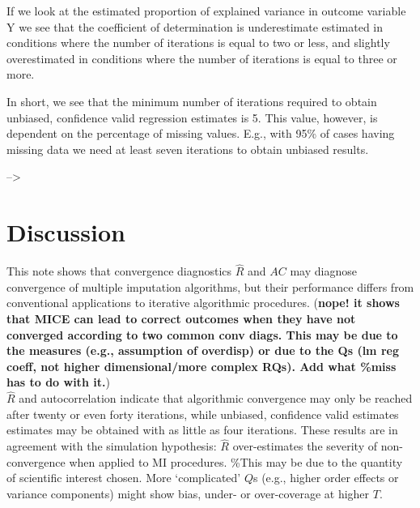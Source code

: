 \documentclass[Royal,times,sageh]{sagej}
\begin{document}
If we look at the estimated proportion of explained variance in outcome
variable Y we see that the coefficient of determination is underestimate
estimated in conditions where the number of iterations is equal to two
or less, and slightly overestimated in conditions where the number of
iterations is equal to three or more.

In short, we see that the minimum number of iterations required to
obtain unbiased, confidence valid regression estimates is 5. This value,
however, is dependent on the percentage of missing values. E.g., with
95\% of cases having missing data we need at least seven iterations to
obtain unbiased results.

--\textgreater{}

\hypertarget{discussion}{%
\section{Discussion}\label{discussion}}

This note shows that convergence diagnostics \(\widehat{R}\) and \(AC\)
may diagnose convergence of multiple imputation algorithms, but their
performance differs from conventional applications to iterative
algorithmic procedures. (\textbf{nope! it shows that MICE can lead to
correct outcomes when they have not converged according to two common
conv diags. This may be due to the measures (e.g., assumption of
overdisp) or due to the Qs (lm reg coeff, not higher dimensional/more
complex RQs). Add what \%miss has to do with it.})\\
\(\widehat{R}\) and autocorrelation indicate that algorithmic
convergence may only be reached after twenty or even forty iterations,
while unbiased, confidence valid estimates estimates may be obtained
with as little as four iterations. These results are in agreement with
the simulation hypothesis: \(\widehat{R}\) over-estimates the severity
of non-convergence when applied to MI procedures. \%This may be due to
the quantity of scientific interest chosen. More `complicated' \(Q\)s
(e.g., higher order effects or variance components) might show bias,
under- or over-coverage at higher \(T\).
\end{document}

